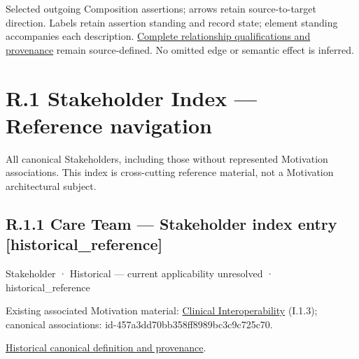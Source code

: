 \begin{center}
\end{center}
{\small Selected outgoing Composition assertions; arrows retain source-to-target direction. Labels retain assertion standing and record state; element standing accompanies each description. \href{structure.json}{Complete relationship qualifications and provenance} remain source-defined. No omitted edge or semantic effect is inferred.}\par
\chapter*{R.1 Stakeholder Index — Reference navigation}
\label{navigation:R.1}

All canonical Stakeholders, including those without represented Motivation associations. This index is cross-cutting reference material, not a Motivation architectural subject.\par
\section*{R.1.1 Care Team — Stakeholder index entry [historical\_reference]}
\label{navigation:R.1.1}

\label{element:6f5a203d81e24a81b384a80781987daa}
{\small Stakeholder · Historical — current applicability unresolved · historical\_reference}\par
{\small Existing associated Motivation material: \hyperref[element:babb9f5d63d8435890c1db3579ec78d9]{Clinical Interoperability} (I.1.3); canonical associations: id-457a3dd70bb358ff8989bc3c9c725c70.}\par
\href{../../../../../../../continuum/motivation/stakeholder/6f5a203d81e24a81b384a80781987daa.md}{Historical canonical definition and provenance}.\par
